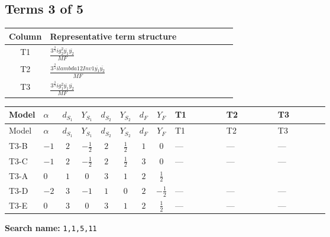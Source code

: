 \documentclass[8pt]{article}
\begin{document}
\begin{landscape}
\subsection*{Terms 3 of 5}
\begin{center}
\begin{tabular}{@{}c >{\raggedright\arraybackslash}p{0.82\linewidth}@{}}
\toprule
Column & Representative term structure \\
\midrule
T1 & \(\displaystyle \frac{3^{\frac{3}{4}} i g_{2}^{2} \overline{y_{1}} \overline{y_{2}}}{MF}\) \\
\midrule
T2 & \(\displaystyle \frac{3^{\frac{3}{4}} i lambda12Inv1 \overline{y_{1}} \overline{y_{2}}}{MF}\) \\
\midrule
T3 & \(\displaystyle \frac{3^{\frac{3}{4}} i g_{1}^{2} \overline{y_{1}} \overline{y_{2}}}{MF}\) \\
\midrule
\bottomrule
\end{tabular}
\end{center}
\smallskip
\tiny
\begin{longtable}{@{}llcccccc >{\raggedright\arraybackslash}p{0.21\linewidth} >{\raggedright\arraybackslash}p{0.21\linewidth} >{\raggedright\arraybackslash}p{0.21\linewidth}@{}}
\toprule
Model & $\alpha$ & $d_{S_1}$ & $Y_{S_1}$ & $d_{S_2}$ & $Y_{S_2}$ & $d_F$ & $Y_F$ & T1 & T2 & T3 \\
\midrule
\endfirsthead
\toprule
Model & $\alpha$ & $d_{S_1}$ & $Y_{S_1}$ & $d_{S_2}$ & $Y_{S_2}$ & $d_F$ & $Y_F$ & T1 & T2 & T3 \\
\midrule
\endhead
T3-B & $-1$ & $2$ & $-\frac{1}{2}$ & $2$ & $\frac{1}{2}$ & $1$ & $0$ & --- & --- & --- \\
\midrule
T3-C & $-1$ & $2$ & $-\frac{1}{2}$ & $2$ & $\frac{1}{2}$ & $3$ & $0$ & --- & --- & --- \\
\midrule
T3-A & $0$ & $1$ & $0$ & $3$ & $1$ & $2$ & $\frac{1}{2}$ & \scriptsize\adjustbox{max width=\linewidth}{$\begin{gathered} - \frac{17 \cdot 3^{\frac{3}{4}} i g_{2}^{2} \overline{y_{1}} \overline{y_{2}}}{24 MF}\end{gathered}$} & \scriptsize\adjustbox{max width=\linewidth}{$\begin{gathered} - \frac{3^{\frac{3}{4}} i lambda12Inv1 \overline{y_{1}} \overline{y_{2}}}{6 MF}\end{gathered}$} & \scriptsize\adjustbox{max width=\linewidth}{$\begin{gathered} - \frac{3^{\frac{3}{4}} i g_{1}^{2} \overline{y_{1}} \overline{y_{2}}}{8 MF}\end{gathered}$} \\
\midrule
T3-D & $-2$ & $3$ & $-1$ & $1$ & $0$ & $2$ & $-\frac{1}{2}$ & --- & --- & --- \\
\midrule
T3-E & $0$ & $3$ & $0$ & $3$ & $1$ & $2$ & $\frac{1}{2}$ & --- & --- & --- \\
\midrule
\bottomrule
\end{longtable}
\clearpage
\noindent\textbf{Search name: }\texttt{1,1,5,11}\par\smallskip

\end{landscape}
\end{document}
